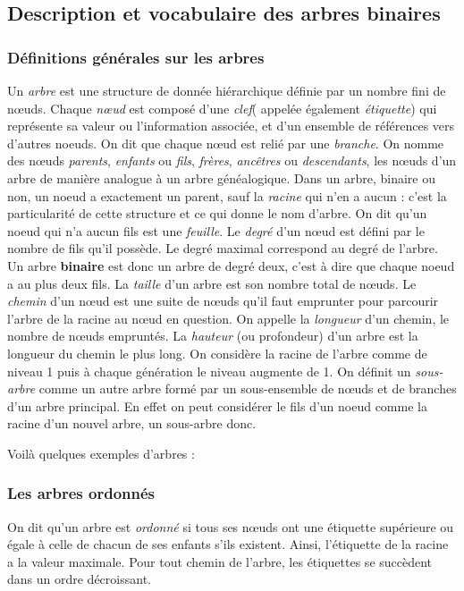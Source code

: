 \documentclass{report}
\begin{document}
\subsection{Description et vocabulaire des arbres binaires}
\subsubsection{Définitions générales sur les arbres}

Un \textit{arbre} est une structure de donnée hiérarchique définie par un nombre fini de nœuds. Chaque \textit{nœud} est composé d'une \textit{clef}( appelée également \textit{étiquette}) qui représente sa valeur ou l'information associée, et d'un ensemble de références vers d'autres noeuds. On dit que chaque nœud est relié par une \textit{branche}. 
On nomme des nœuds \textit{parents}, \textit{enfants} ou \textit{fils}, \textit{frères}, \textit{ancêtres} ou \textit{descendants}, les nœuds d'un arbre de manière analogue à un arbre généalogique. Dans un arbre, binaire ou non, un noeud a exactement un parent, sauf la \textit{racine} qui n'en a aucun : c'est la particularité de cette structure et ce qui donne le nom d'arbre. 
On dit qu'un noeud qui n'a aucun fils est une \textit{feuille}.
Le \textit{degré} d'un nœud est défini par le nombre de fils qu'il possède. Le degré maximal correspond au degré de l'arbre.
Un arbre \textbf{binaire} est donc un arbre de degré deux, c'est à dire que chaque noeud a au plus deux fils.
La \textit{taille} d'un arbre est son nombre total de nœuds.
Le \textit{chemin} d'un nœud est une suite de nœuds qu'il faut emprunter pour parcourir l'arbre de la racine au nœud en question. On appelle la \textit{longueur} d'un chemin, le nombre de nœuds empruntés.
La \textit{hauteur} (ou profondeur) d'un arbre est la longueur du chemin le plus long.
On considère la racine de l'arbre comme de niveau 1 puis à chaque génération le niveau augmente de 1.
On définit un \textit{sous-arbre} comme un autre arbre formé par un sous-ensemble de nœuds et de branches d'un arbre principal. En effet on peut considérer le fils d'un noeud comme la racine d'un nouvel arbre, un sous-arbre donc. 

Voilà quelques exemples d'arbres :

\subsubsection{Les arbres ordonnés}

On dit qu'un arbre est \textit{ordonné} si tous ses nœuds ont une étiquette supérieure ou égale à celle de chacun de ses enfants s'ils existent. Ainsi, l'étiquette de la racine a la valeur maximale. Pour tout chemin de l'arbre, les étiquettes se succèdent dans un ordre décroissant.
\end{document}
